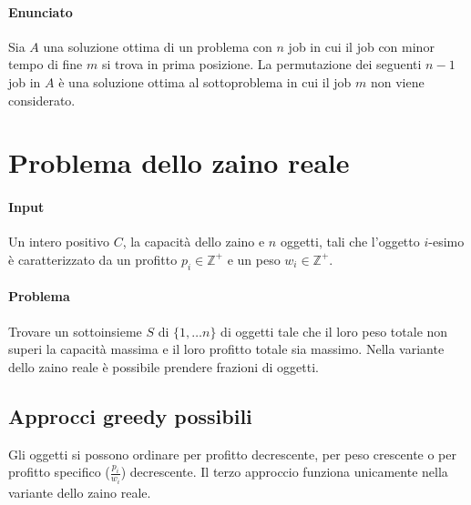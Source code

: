 \paragraph{Enunciato}
Sia $A$ una soluzione ottima di un problema con $n$ job in cui il job con minor tempo di fine $m$ si trova in prima posizione. La permutazione dei seguenti $n-1$ job in $A$ \`e una
soluzione ottima al sottoproblema in cui il job $m$ non viene considerato. 
\section{Problema dello zaino reale}
\paragraph{Input}
Un intero positivo $C$, la capacit\`a dello zaino e $n$ oggetti, tali che l'oggetto $i$-esimo \`e caratterizzato da un profitto $p_i\in\mathbb{Z}^+$ e un peso $w_i\in\mathbb{Z}^+$.
\paragraph{Problema}
Trovare un sottoinsieme $S$ di $\{1,\dots n\}$ di oggetti tale che il loro peso totale non superi la capacit\`a massima e il loro profitto totale sia massimo. Nella variante dello zaino
reale \`e possibile prendere frazioni di oggetti.
\subsection{Approcci greedy possibili}
Gli oggetti si possono ordinare per profitto decrescente, per peso crescente o per profitto specifico ($\frac{p_i}{w_i}$) decrescente. Il terzo approccio funziona unicamente nella
variante dello zaino reale.
